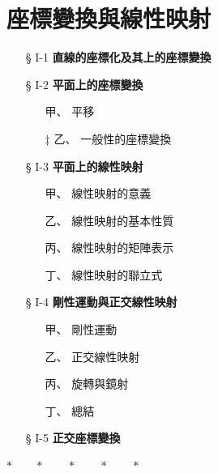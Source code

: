 
\section{座標變換與線性映射}
\label{sec:b4-ch1}

\begin{center}
\begin{minipage}{0.75\textwidth}
\begin{itemize}[leftmargin=2em, itemsep=0.3em]
  \item[§ I-1] \textbf{直線的座標化及其上的座標變換}
  \item[§ I-2] \textbf{平面上的座標變換}
  \begin{itemize}[leftmargin=2em, itemsep=0.2em]
    \item[甲、] 平移
    \item[$\ddagger$ 乙、] 一般性的座標變換
  \end{itemize}
  \item[§ I-3] \textbf{平面上的線性映射}
  \begin{itemize}[leftmargin=2em, itemsep=0.2em]
    \item[甲、] 線性映射的意義
    \item[乙、] 線性映射的基本性質
    \item[丙、] 線性映射的矩陣表示
    \item[丁、] 線性映射的聯立式
  \end{itemize}
  \item[§ I-4] \textbf{剛性運動與正交線性映射}
  \begin{itemize}[leftmargin=2em, itemsep=0.2em]
    \item[甲、] 剛性運動
    \item[乙、] 正交線性映射
    \item[丙、] 旋轉與鏡射
    \item[丁、] 總結
  \end{itemize}
  \item[§ I-5] \textbf{正交座標變換}
\end{itemize}
\end{minipage}
\end{center}

\begin{center}
$* \qquad * \qquad * \qquad * \qquad *$
\end{center}

